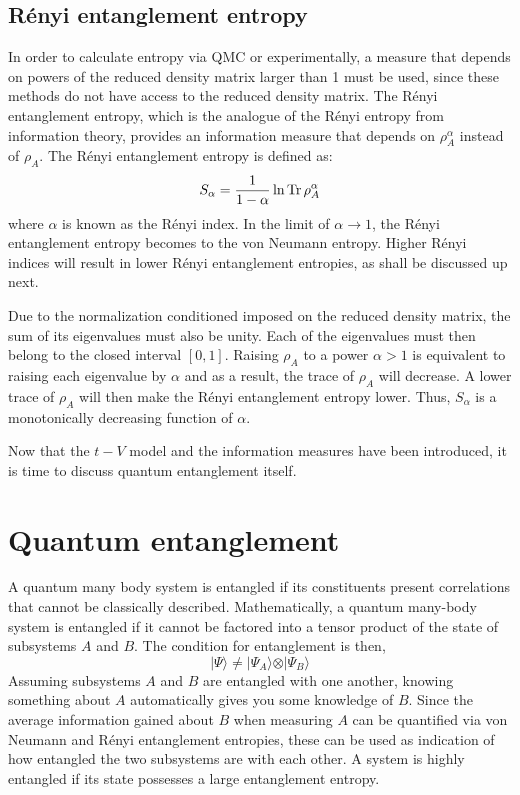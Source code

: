 	\subsection{R\'enyi entanglement entropy}
	
	In order to calculate entropy via QMC or experimentally, a measure that depends on powers of the reduced density matrix larger than 1 must be used, since these methods do not have access to the reduced density matrix. The R\'enyi entanglement entropy, which is the analogue of the R\'enyi entropy from information theory, provides an information measure that depends on $\rho_{A}^{\alpha}$ instead of $\rho_{A}$. The R\'enyi entanglement entropy is defined as:
	\begin{equation}
	\label{eq: renyiEE}
	S_{\alpha} = \frac{1}{1-\alpha} \ln \operatorname{Tr} \rho_{A}^{\alpha}
	\end{equation}
	where $\alpha$ is known as the R\'enyi index. In the limit of $\alpha \to 1$, the R\'enyi entanglement entropy becomes to the von Neumann entropy. Higher R\'enyi indices will result in lower R\'enyi entanglement entropies, as shall be discussed up next.
	
	Due to the normalization conditioned imposed on the reduced density matrix, the sum of its eigenvalues must also be unity. Each of the eigenvalues must then belong to the closed interval $\left [ 0,1 \right ]$. Raising $\rho_A$ to a power $\alpha > 1$ is equivalent to raising each eigenvalue by $\alpha$ and as a result, the trace of $\rho_A$ will decrease. A lower trace of $\rho_A$ will then make the R\'enyi entanglement entropy lower. Thus, $S_{\alpha}$ is a monotonically decreasing function of $\alpha$. 
	
	Now that the $t-V$ model and the information measures have been introduced, it is time to discuss quantum entanglement itself.
	
\section{Quantum entanglement}
\label{sec:quantumEntanglement}

	A quantum many body system is entangled if its constituents present correlations that cannot be classically described. 	Mathematically, a quantum many-body system is entangled if it cannot be factored into a tensor product of the state of subsystems $A$ and $B$. The condition for entanglement is then,
%	
	\begin{equation}
	\vert\Psi\rangle \neq \vert\Psi_{A}\rangle \otimes \vert\Psi_{B}\rangle
	\label{eq:entanglementCondition}
	\end{equation}
%
	Assuming subsystems $A$ and $B$ are entangled with one another, knowing something about $A$ automatically gives you some knowledge of $B$. Since the average information gained about $B$ when measuring $A$ can be quantified via von Neumann and R\'enyi entanglement entropies, these can be used as indication of how entangled the two subsystems are with each other. A system is highly entangled if its state possesses a large entanglement entropy.
	
